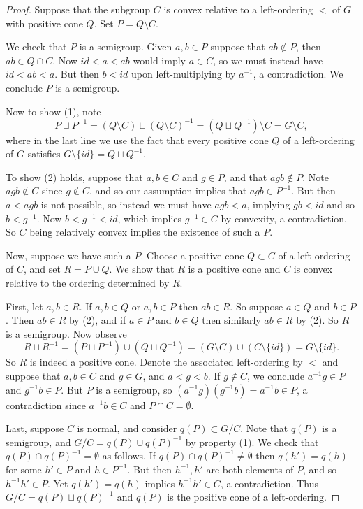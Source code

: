 \documentclass{amsart}
\theoremstyle{definition}
\theoremstyle{remark}
\begin{document}
\begin{proof}
    Suppose that the subgroup $C$ is convex relative to a left-ordering $<$ of $G$ with positive cone $Q$.  Set $P = Q \setminus C$.  

    We check that $P$ is a semigroup.  Given $a, b \in P$ suppose that $ab \notin P$, then $ab \in Q \cap C$.  Now $id < a <ab$ would imply $a \in C$, so we must instead have $id <ab <a$.  But then $b <id$ upon left-multiplying by $a^{-1}$, a contradiction.  We conclude $P$ is a semigroup.

Now to show (1), note 
    \[ P \sqcup P^{-1} = (Q\setminus C) \sqcup (Q\setminus C)^{-1} = (Q \sqcup Q^{-1})\setminus C = G \setminus C,
    \]
where in the last line we use the fact that every positive cone $Q$ of a left-ordering of $G$ satisfies $G\setminus \{id\} = Q \sqcup Q^{-1}$.
   
    To show (2) holds, suppose that $a, b \in C$ and $g \in P$, and that $agb \notin P$.  Note $agb \notin C$ since $g \notin C$, and so our assumption implies that $agb \in P^{-1}$.  But then $a<agb$ is not possible, so instead we must have $agb <a$, implying $gb<id$ and so $b<g^{-1}$.  Now $b<g^{-1}<id$, which implies $g^{-1} \in C$ by convexity, a contradiction.  So $C$ being relatively convex implies the existence of such a $P$.

    Now, suppose we have such a $P$.  Choose a positive cone $Q \subset C$ of a left-ordering of $C$, and set $R = P \cup Q$.  We show that $R$ is a positive cone and $C$ is convex relative to the ordering determined by $R$.

    First, let $a, b \in R$.  If $a, b \in Q$ or $a, b \in P$ then $ab \in R$.  So suppose $a \in Q$ and $b \in P$.  Then $ab \in R$ by (2), and if $a \in P$ and $b \in Q$ then similarly $ab \in R$ by (2).  So $R$ is a semigroup.  Now observe
    \[ R \sqcup R^{-1} = (P \sqcup P^{-1}) \cup (Q \sqcup Q^{-1}) = (G \setminus C) \cup (C \setminus \{id\}) = G \setminus \{id\}.
    \]
    So $R$ is indeed a positive cone.  Denote the associated left-ordering by $<$ and suppose that $a,b \in C$ and $g \in G$, and $a<g<b$.  If $g \notin C$, we conclude $a^{-1}g \in P$ and $g^{-1}b \in P$.  But $P$ is a semigroup, so $(a^{-1}g)(g^{-1}b) = a^{-1}b \in P$, a contradiction since $a^{-1}b \in C$ and $P \cap C = \emptyset$.

Last, suppose $C$ is normal, and consider $q(P) \subset G/C$.  Note that $q(P)$ is a semigroup, and $G/C = q(P) \cup q(P)^{-1}$ by property (1).  We check that $q(P) \cap q(P)^{-1} = \emptyset$ as follows.  If $q(P) \cap q(P)^{-1} \neq \emptyset$ then $q(h') = q(h)$ for some $h' \in P$ and $h \in P^{-1}$.  But then $h^{-1}, h'$ are both elements of $P$, and so $h^{-1}h' \in P$.  Yet $q(h') = q(h)$ implies $h^{-1}h' \in C$, a contradiction.  Thus $G/C = q(P) \sqcup q(P)^{-1}$ and $q(P)$ is the positive cone of a left-ordering.
\end{proof}
\end{document}

